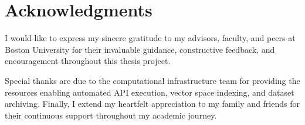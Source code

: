 
\chapter*{Acknowledgments}

I would like to express my sincere gratitude to my advisors, faculty, and peers at Boston University for their invaluable guidance, constructive feedback, and encouragement throughout this thesis project. 

Special thanks are due to the computational infrastructure team for providing the resources enabling automated API execution, vector space indexing, and dataset archiving. Finally, I extend my heartfelt appreciation to my family and friends for their continuous support throughout my academic journey.

\newpage